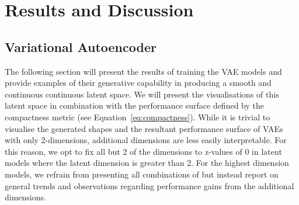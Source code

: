 \documentclass{article}
\begin{document}
\begin{table}[h]
\centering
{}
\caption{Genetic Algorithm Tested Optimisation Tasks for Latent Representations Shapes}
\label{tab:GA_models_latent}
\end{table}


\newpage{}

\section{Results and Discussion}
\subsection{Variational Autoencoder}
The following section will present the results of training the VAE models and provide examples of their generative capability in producing a smooth and continuous continuous latent space. We will present the visualisations of this latent space in combination with the performance surface defined by the compactness metric (see Equation~\eqref{eq:compactness}). While it is trivial to visualise the generated shapes and the resultant performance surface of VAEs with only 2-dimensions, additional dimensions are less easily interpretable. For this reason, we opt to fix all but 2 of the dimensions to z-values of 0 in latent models where the latent dimension is greater than 2. For the highest dimension models, we refrain from presenting all combinations of but instead report on general trends and observations regarding performance gains from the additional dimensions. 
\end{document}

